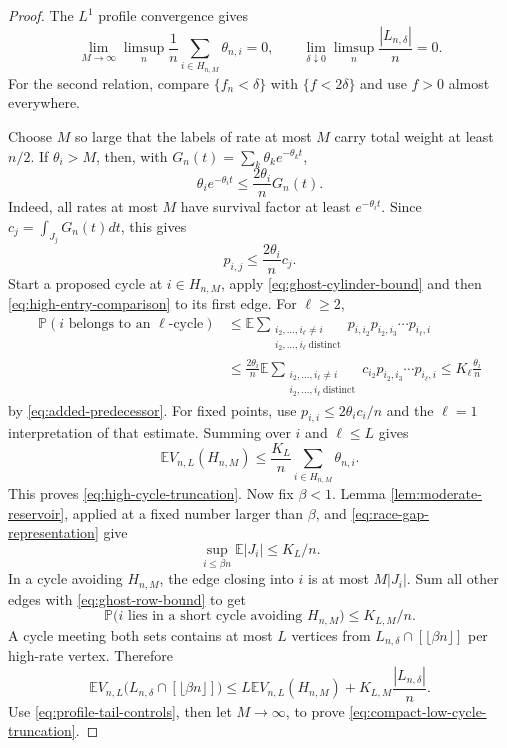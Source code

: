 \documentclass[11pt]{article}
\theoremstyle{remark}
\theoremstyle{plain}
\newcommand{\E}{\mathbb E}
\newcommand{\Pp}{\mathbb P}
\begin{document}
\begin{proof}
The $L^1$ profile convergence gives
\begin{equation}\label{eq:profile-tail-controls}
 \lim_{M\to\infty}\limsup_n\frac1n
 \sum_{i\in H_{n,M}}\theta_{n,i}=0,
 \qquad
 \lim_{\delta\downarrow0}\limsup_n\frac{|L_{n,\delta}|}{n}=0.
\end{equation}
For the second relation, compare $\{f_n<\delta\}$ with
$\{f<2\delta\}$ and use $f>0$ almost everywhere.

Choose $M$ so large that the labels of rate at most $M$ carry total weight at
least $n/2$.  If $\theta_i>M$, then, with
$G_n(t)=\sum_k\theta_k e^{-\theta_kt}$,
\[
 \theta_i e^{-\theta_i t}\le\frac{2\theta_i}{n}G_n(t).
\]
Indeed, all rates at most $M$ have survival factor at least
$e^{-\theta_i t}$.  Since $c_j=\int_{J_j}G_n(t)dt$, this gives
\begin{equation}\label{eq:high-entry-comparison}
 p_{i,j}\le\frac{2\theta_i}{n}c_j.
\end{equation}
Start a proposed cycle at $i\in H_{n,M}$, apply
\eqref{eq:ghost-cylinder-bound} and then
\eqref{eq:high-entry-comparison} to its first edge.  For $\ell\ge2$,
\begin{align*}
 \Pp(i\text{ belongs to an }\ell\text{-cycle})
 &\le \E\sum_{\substack{i_2,\ldots,i_\ell\ne i\\
                         i_2,\ldots,i_\ell\ {\mathrm{distinct}}}}
 p_{i,i_2}p_{i_2,i_3}\cdots p_{i_\ell,i}\\
 &\le \frac{2\theta_i}{n}\E
 \sum_{\substack{i_2,\ldots,i_\ell\ne i\\
                  i_2,\ldots,i_\ell\ {\mathrm{distinct}}}}
 c_{i_2}p_{i_2,i_3}\cdots p_{i_\ell,i}
 \le K_\ell\frac{\theta_i}{n}
\end{align*}
by \eqref{eq:added-predecessor}.  For fixed points, use
$p_{i,i}\le2\theta_i c_i/n$ and the $\ell=1$ interpretation of that estimate.
Summing over $i$ and $\ell\le L$ gives
\begin{equation}\label{eq:quantitative-high-cycles}
 \E V_{n,L}(H_{n,M})
 \le\frac{K_L}{n}\sum_{i\in H_{n,M}}\theta_{n,i}.
\end{equation}
This proves \eqref{eq:high-cycle-truncation}.  Now fix $\beta<1$.  Lemma
\ref{lem:moderate-reservoir}, applied at a fixed number larger than $\beta$,
and \eqref{eq:race-gap-representation} give
\begin{equation}\label{eq:interior-window-length}
 \sup_{i\le\beta n}\E|J_i|\le K_L/n.
\end{equation}
In a cycle avoiding $H_{n,M}$, the edge closing into $i$ is at most
$M|J_i|$.  Sum all other edges with \eqref{eq:ghost-row-bound} to get
\[
 \Pp\bigl(i\text{ lies in a short cycle avoiding }H_{n,M}\bigr)
 \le K_{L,M}/n.
\]
A cycle meeting both sets contains at most $L$ vertices from
$L_{n,\delta}\cap[\lfloor\beta n\rfloor]$ per high-rate vertex.  Therefore
\[
 \E V_{n,L}\bigl(L_{n,\delta}\cap[\lfloor\beta n\rfloor]\bigr)
 \le L\E V_{n,L}(H_{n,M})
   +K_{L,M}\frac{|L_{n,\delta}|}{n}.
\]
Use \eqref{eq:profile-tail-controls}, then let $M\to\infty$, to prove
\eqref{eq:compact-low-cycle-truncation}.
\end{proof}
\end{document}
